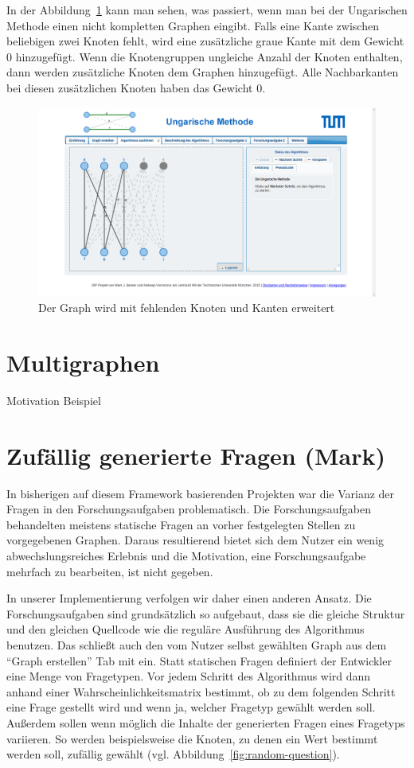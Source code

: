 In der Abbildung~\ref{fig:hungarian-complete} kann man sehen, was passiert, wenn man bei der Ungarischen Methode einen nicht kompletten Graphen eingibt. Falls eine Kante zwischen beliebigen zwei Knoten fehlt, wird eine zusätzliche graue Kante mit dem Gewicht 0 hinzugefügt. Wenn die Knotengruppen ungleiche Anzahl der Knoten enthalten, dann werden zusätzliche Knoten dem Graphen hinzugefügt. Alle Nachbarkanten bei diesen zusätzlichen Knoten haben das Gewicht 0.
\begin{figure}[h!]
	\centering
	\includegraphics[width=\textwidth]{figures/hungarian-complete}
	\caption[Ungarische Methode]{Der Graph wird mit fehlenden Knoten und Kanten erweitert}\label{fig:hungarian-complete}
\end{figure}

\section{Multigraphen}
Motivation
Beispiel

\section{Zufällig generierte Fragen (Mark)}
In bisherigen auf diesem Framework basierenden Projekten war die Varianz der Fragen in den Forschungsaufgaben problematisch. Die Forschungsaufgaben behandelten meistens statische Fragen an vorher festgelegten Stellen zu vorgegebenen Graphen. Daraus resultierend bietet sich dem Nutzer ein wenig abwechslungsreiches Erlebnis und die Motivation, eine Forschungsaufgabe mehrfach zu bearbeiten, ist nicht gegeben.

In unserer Implementierung verfolgen wir daher einen anderen Ansatz. Die Forschungsaufgaben sind grundsätzlich so aufgebaut, dass sie die gleiche Struktur und den gleichen Quellcode wie die reguläre Ausführung des Algorithmus benutzen. Das schließt auch den vom Nutzer selbst gewählten Graph aus dem \enquote{Graph erstellen} Tab mit ein. Statt statischen Fragen definiert der Entwickler eine Menge von Fragetypen. Vor jedem Schritt des Algorithmus wird dann anhand einer Wahrscheinlichkeitsmatrix bestimmt, ob zu dem folgenden Schritt eine Frage gestellt wird und wenn ja, welcher Fragetyp gewählt werden soll. Außerdem sollen wenn möglich die Inhalte der generierten Fragen eines Fragetyps variieren. So werden beispielsweise die Knoten, zu denen ein Wert bestimmt werden soll, zufällig gewählt (vgl. Abbildung~\ref{fig:random-question}).

